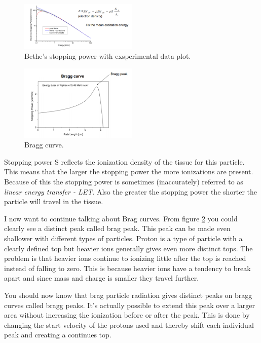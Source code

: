 \documentclass[jmp, amsmath, amssymb, reprint]{article}
\numberwithin{equation}{section}
\begin{document}
\begin{multicols}{2}
\begin{figure}[H]
	\centering
  	\includegraphics[width=0.50\textwidth]{bethe_energy.png}
	\caption{Bethe's stopping power with exsperimental data plot.}
	\label{fig:bethes_energy}
\end{figure}

\begin{figure}[H]
	\centering
  	\includegraphics[width=0.50\textwidth]{bragg.png}
	\caption{Bragg curve.}
	\label{fig:bragg}
\end{figure}

Stopping power S reflects the ionization density of the tissue for this particle. This means that the larger the stopping power the more ionizations are present. Because of this the stopping power is sometimes (inaccurately) referred to as \textit{linear energy transfer - LET}. Also the greater the stopping power the shorter the particle will travel in the tissue.

I now want to continue talking about Brag curves. From figure \ref{fig:bragg} you could clearly see a distinct peak called brag peak. This peak can be made even shallower with different types of particles. Proton is a type of particle with a clearly defined top but heavier ions generally gives even more distinct tops. The problem is that heavier ions continue to ionizing little after the top is reached instead of falling to zero. This is because heavier ions have a tendency to break apart and since mass and charge is smaller they travel further.

You should now know that brag particle radiation gives distinct peaks on bragg curves called bragg peaks. It's actually possible to extend this peak over a larger area without increasing the ionization before or after the peak. This is done by changing the start velocity of the protons used and thereby shift each individual peak and creating a continues top.



\end{multicols}
\end{document}
